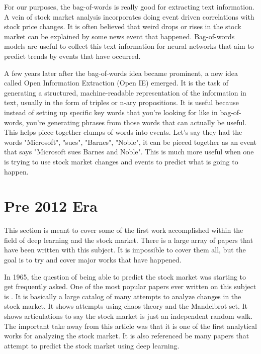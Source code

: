 \documentclass{article}
\theoremstyle{plain}
\theoremstyle{definition}
\numberwithin{equation}{section}
\numberwithin{theorem}{section}
\numberwithin{lemma}{section}
\numberwithin{definition}{section}
\numberwithin{proposition}{section}
\numberwithin{corollary}{section}
\begin{document}
	
	
	For our purposes, the bag-of-words is really good for extracting text information. A vein of stock market analysis incorporates doing event driven correlations with stock price changes. It is often believed that weird drops or rises in the stock market can be explained by some news event that happened. Bag-of-words models are useful to collect this text information for neural networks that aim to predict trends by events that have occurred.
	
	
	A few years later after the bag-of-words idea became prominent, a new idea called Open Information Extraction  (Open IE) emerged. It is the task of generating a structured, machine-readable representation of the information in text, usually in the form of triples or n-ary propositions. It is useful because instead of setting up specific key words that you're looking for like in bag-of-words, you're generating phrases from those words that can actually be useful. This helps piece together clumps of words into events. Let's say they had the words {"Microsoft", "sues", "Barnes", "Noble"}, it can be pieced together as an event that says "Microsoft sues Barnes and Noble". This is much more useful when one is trying to use stock market changes and events to predict what is going to happen.
	
	\section{Pre 2012 Era}
	This section is meant to cover some of the first work accomplished within the field of deep learning and the stock market. There is a large array of papers that have been written with this subject. It is impossible to cover them all, but the goal is to try and cover major works that have happened.
	
	
	In 1965, the question of being able to predict the stock market was starting to get frequently asked. One of the most popular papers ever written on this subject is \cite{behaviorOf}. It is basically a large catalog of many attempts to analyze changes in the stock market. It shows attempts using chaos theory and the Mandelbrot set. It shows articulations to say the stock market is just an independent random walk. The important take away from this article was that it is one of the first analytical works for analyzing the stock market. It is also referenced be many papers that attempt to predict the stock market using deep learning.
	
\end{document}
